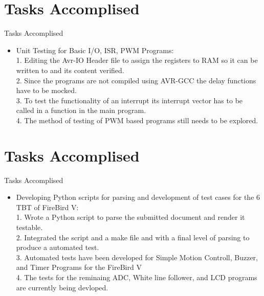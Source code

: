 \documentclass[10pt, a4paper]{beamer}
\begin{document}
\section{Tasks Accomplised}
\begin{frame}{Tasks Accomplised}
	\begin{itemize}
	  \item Unit Testing for Basic I/O, ISR, PWM Programs:\\
	  \hspace{.1cm} 1. Editing the Avr-IO Header file to assign the registers to RAM so it can be written to and its content verified. \\
          \hspace{.1cm} 2. Since the programs are not compiled using AVR-GCC the delay functions have to be mocked.\\
	  \hspace{.1cm} 3. To test the functionality of an interrupt its interrupt vector has to be called in a function in the main program. \\
	  \hspace{.1cm} 4. The method of testing of PWM based programs still needs to be explored. \\
	\end{itemize}
\end{frame}

\section{Tasks Accomplised}
\begin{frame}{Tasks Accomplised}
	\begin{itemize}
	  \item Developing Python scripts for parsing and development of test cases for the 6 TBT of FireBird V:\\
	  \hspace{.1cm} 1. Wrote a Python script to parse the submitted document and render it testable. \\
          \hspace{.1cm} 2. Integrated the script and a make file and with a final level of parsing to produce a automated test.\\
	  \hspace{.1cm} 3. Automated tests have been developed for Simple Motion Controll, Buzzer, and Timer Programs for the FireBird V \\
	  \hspace{.1cm} 4. The tests for the reminaing ADC, White line follower, and LCD programs are currently being devloped. \\
	\end{itemize}
\end{frame}
\end{document}
